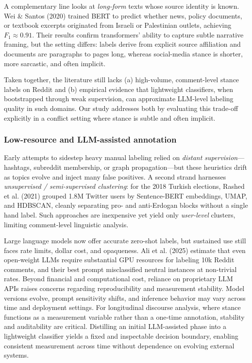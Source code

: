 \documentclass[letterpaper]{article} %
\begin{document}
A complementary line looks at \emph{long-form} texts whose source identity is known.  Wei \& Santos (2020) \cite{wei2020narrative} trained BERT to predict whether news, policy documents, or textbook excerpts originated from Israeli or Palestinian outlets, achieving $F_{1}\!\approx\!0.91$.  Their results confirm transformers’ ability to capture subtle narrative framing, but the setting differs: labels derive from explicit source affiliation and documents are paragraphs to pages long, whereas social-media stance is shorter, more sarcastic, and often implicit.

Taken together, the literature still lacks (a) high-volume, comment-level stance labels on Reddit and (b) empirical evidence that lightweight classifiers, when bootstrapped through weak supervision, can approximate LLM-level labeling quality in such domains. Our study addresses both by evaluating this trade-off explicitly in a conflict setting where stance is subtle and often implicit.

\subsubsection{Low-resource and LLM-assisted annotation}
Early attempts to sidestep heavy manual labeling relied on \emph{distant supervision}---hashtags, subreddit membership, or graph propagation---but these heuristics drift as topics evolve and inject many false positives.  A second strand harnesses \emph{unsupervised / semi-supervised clustering}: for the 2018 Turkish elections, Rashed et al. (2021) \cite{rashed2021embeddings} grouped 1.8M Twitter users by Sentence-BERT embeddings, UMAP, and HDBSCAN, cleanly separating pro- and anti-Erdogan blocks without a single hand label.  Such approaches are inexpensive yet yield only \textit{user-level} clusters, limiting comment-level linguistic analysis.

Large language models now offer accurate zero-shot labels, but sustained use still faces rate limits, dollar cost, and opaqueness. Ali et al. (2025) \cite{ali2025social} estimate that even open-weight LLMs require substantial GPU resources for labeling 10k Reddit comments, and their best prompt misclassified neutral instances at non-trivial rates. Beyond financial and computational cost, reliance on proprietary LLM APIs raises concerns regarding reproducibility and measurement stability. Model versions evolve, prompt sensitivity shifts, and inference behavior may vary across time and deployment settings. For longitudinal discourse analysis, where stance functions as a measurement variable rather than a one-time annotation, stability and auditability are critical. Distilling an initial LLM-assisted phase into a lightweight classifier yields a fixed and inspectable decision boundary, enabling consistent measurement across time without dependence on evolving external systems.
\end{document}
